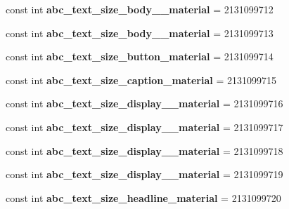 \begin{DoxyCompactItemize}
const int {\bfseries abc\+\_\+text\+\_\+size\+\_\+body\+\_\+\_\+material} = 2131099712
\item 
\mbox{\label{classXaria_1_1Resource_1_1Dimension_a0e985e0f0f1ba460a52e1bec66d21651}} 
const int {\bfseries abc\+\_\+text\+\_\+size\+\_\+body\+\_\+\_\+material} = 2131099713
\item 
\mbox{\label{classXaria_1_1Resource_1_1Dimension_a087ee5f5b7fe8ef2b61359205523e7a7}} 
const int {\bfseries abc\+\_\+text\+\_\+size\+\_\+button\+\_\+material} = 2131099714
\item 
\mbox{\label{classXaria_1_1Resource_1_1Dimension_ab4cc98d9a23d6bf8c16f0271e41287b0}} 
const int {\bfseries abc\+\_\+text\+\_\+size\+\_\+caption\+\_\+material} = 2131099715
\item 
\mbox{\label{classXaria_1_1Resource_1_1Dimension_af5f2031381c36b7d0875d672f36fa167}} 
const int {\bfseries abc\+\_\+text\+\_\+size\+\_\+display\+\_\+\_\+material} = 2131099716
\item 
\mbox{\label{classXaria_1_1Resource_1_1Dimension_a833f4413d1db68edee634f189bd946ce}} 
const int {\bfseries abc\+\_\+text\+\_\+size\+\_\+display\+\_\+\_\+material} = 2131099717
\item 
\mbox{\label{classXaria_1_1Resource_1_1Dimension_a7bf0221b078625c2a7c671911080793b}} 
const int {\bfseries abc\+\_\+text\+\_\+size\+\_\+display\+\_\+\_\+material} = 2131099718
\item 
\mbox{\label{classXaria_1_1Resource_1_1Dimension_ad2efd4c8c8bda1c065f1eac330fc7509}} 
const int {\bfseries abc\+\_\+text\+\_\+size\+\_\+display\+\_\+\_\+material} = 2131099719
\item 
\mbox{\label{classXaria_1_1Resource_1_1Dimension_ad61f7b159218166edce2f8583eef5b2f}} 
const int {\bfseries abc\+\_\+text\+\_\+size\+\_\+headline\+\_\+material} = 2131099720
\item 
\mbox{\label{classXaria_1_1Resource_1_1Dimension_aef7ca4ea654cc2dd8c4bb7750709718e}} 

\end{DoxyCompactItemize}
